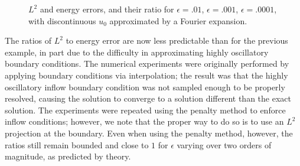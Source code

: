 \begin{figure}[h!]
\centering
{}
\caption{$L^2$ and energy errors, and their ratio for $\epsilon=.01$, $\epsilon=.001$, $\epsilon=.0001$, with discontinuous $u_0$ approximated by a Fourier expansion. }
\label{disc_sol_fourier}
\end{figure}

The ratios of $L^2$ to energy error are now less predictable than for the previous example, in part due to the difficulty in approximating highly oscillatory boundary conditions. The numerical experiments were originally performed by applying boundary conditions via interpolation; the result was that the highly oscillatory inflow boundary condition was not sampled enough to be properly resolved, causing the solution to converge to a solution different than the exact solution.  The experiments were repeated using the penalty method to enforce inflow conditions; however, we note that the proper way to do so is to use an $L^2$ projection at the boundary.  Even when using the penalty method, however, the ratios still remain bounded and close to $1$ for $\epsilon$ varying over two orders of magnitude, as predicted by theory. 

